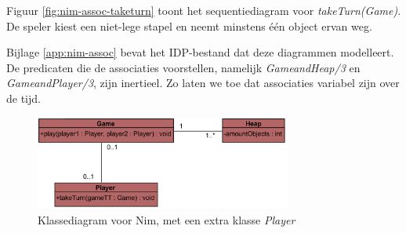 Figuur \ref{fig:nim-assoc-taketurn} toont het sequentiediagram voor \textit{takeTurn(Game)}. De speler kiest een niet-lege stapel en neemt minstens \'e\'en object ervan weg.

Bijlage \ref{app:nim-assoc} bevat het IDP-bestand dat deze diagrammen modelleert. De predicaten die de associaties voorstellen, namelijk \textit{GameandHeap/3} en \textit{GameandPlayer/3}, zijn inertieel. Zo laten we toe dat associaties variabel zijn over de tijd.

\begin{figure}
	\centering
	\includegraphics[width=0.75\textwidth]{chap-declaratieve-seq/nim-assoc-cd.png}
	\caption{Klassediagram voor Nim, met een extra klasse \textit{Player}}
	\label{fig:nim-assoc-cd}
\end{figure}

